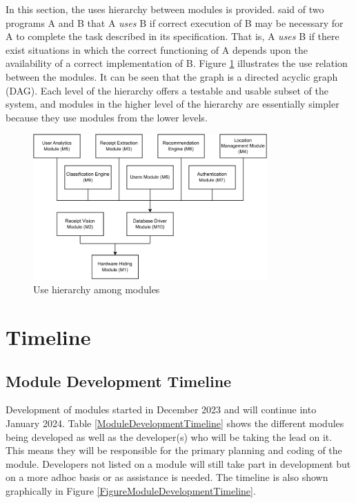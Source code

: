 \documentclass[12pt, titlepage]{article}
\begin{document}
In this section, the uses hierarchy between modules is
provided. \citet{Parnas1978} said of two programs A and B that A {\em uses} B if
correct execution of B may be necessary for A to complete the task described in
its specification. That is, A {\em uses} B if there exist situations in which
the correct functioning of A depends upon the availability of a correct
implementation of B.  Figure \ref{FigUH} illustrates the use relation between
the modules. It can be seen that the graph is a directed acyclic graph
(DAG). Each level of the hierarchy offers a testable and usable subset of the
system, and modules in the higher level of the hierarchy are essentially simpler
because they use modules from the lower levels.

\begin{figure}[H]
\centering
\includegraphics[width=0.8\textwidth]{./res/modulehierarchy.pdf}
\caption{Use hierarchy among modules}
\label{FigUH}
\end{figure}

\section{Timeline}

\subsection{Module Development Timeline}

Development of modules started in December 2023 and will continue into January 2024. Table \ref{ModuleDevelopmentTimeline}
shows the different modules being developed as well as the developer(s) who will be taking the lead
on it. This means they will be responsible for the primary planning and coding of the module. Developers not listed
on a module will still take part in development but on a more adhoc basis or as assistance is needed.
The timeline is also shown graphically in Figure \ref{FigureModuleDevelopmentTimeline}.
\end{document}
